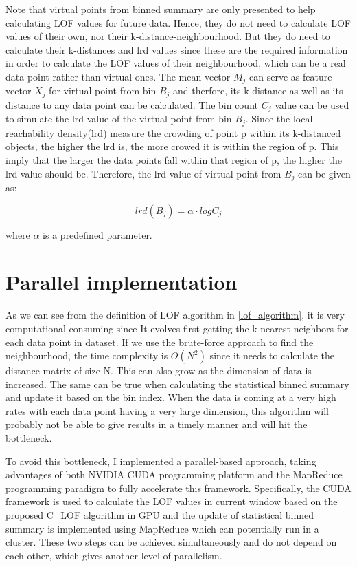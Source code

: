 \documentclass[11pt]{article}       %
\begin{document}
Note that virtual points from binned summary are only presented to help calculating LOF values for future data. Hence, they do not need to calculate LOF values of their own, nor their k-distance-neighbourhood. But they do need to calculate their k-distances and lrd values since these are the required information in order to calculate the LOF values of their neighbourhood, which can be a real data point rather than virtual ones. The mean vector $M_j$ can serve as feature vector $X_j$ for virtual point from bin $B_j$ and therfore, its k-distance as well as its distance to any data point can be calculated. The bin count $C_j$ value can be used to simulate the lrd value of the virtual point from bin $B_j$. Since the local reachability density(lrd) measure the crowding of point p within its k-distanced objects, the higher the lrd is, the more crowed it is within the region of p. This imply that the larger the data points fall within that region of p, the higher the lrd value should be. Therefore, the lrd value of virtual point from $B_j$ can be given as:

\begin{equation} \label{vir_lrd}
	lrd(B_j) = \alpha \cdot log C_j 
\end{equation}

where $\alpha$ is a predefined parameter.

\section{Parallel implementation} \label{proapp}

As we can see from the definition of LOF algorithm in \ref{lof_algorithm}, it is very computational consuming since It evolves first getting the k nearest neighbors for each data point in dataset. If we use the brute-force approach to find the neighbourhood, the time complexity is $O(N^2)$ since it needs to calculate the distance matrix of size N. This can also grow as the dimension of data is increased. The same can be true when calculating the statistical binned summary and update it based on the bin index. When the data is coming at a very high rates with each data point having a very large dimension, this algorithm will probably not be able to give results in a timely manner and will hit the bottleneck. 

To avoid this bottleneck, I implemented a parallel-based approach, taking advantages of both NVIDIA CUDA programming platform and the MapReduce programming paradigm to fully accelerate this framework. Specifically, the CUDA framework is used to calculate the LOF values in current window based on the proposed C\_LOF algorithm in GPU and the update of statistical binned summary is implemented using MapReduce which can potentially run in a cluster. These two steps can be achieved simultaneously and do not depend on each other, which gives another level of parallelism.
\end{document}
